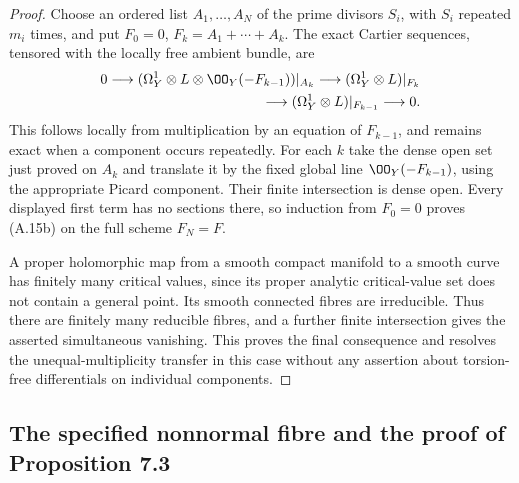 \begin{proof}
Choose an ordered list $A_1,\ldots,A_N$ of the prime divisors $S_i$, with $S_i$ repeated $m_i$ times, and put $F_0=0$, $F_k=A_1+\cdots+A_k$. The exact Cartier sequences, tensored with the locally free ambient bundle, are
\[
\begin{split}
0\longrightarrow
 (\Omega_Y^1\otimes L\otimes\OO_Y(-F_{k-1}))|_{A_k}
 \longrightarrow (\Omega_Y^1\otimes L)|_{F_k}\\
 \longrightarrow(\Omega_Y^1\otimes L)|_{F_{k-1}}
 \longrightarrow0.
\end{split}
\]
This follows locally from multiplication by an equation of $F_{k-1}$, and remains exact when a component occurs repeatedly. For each $k$ take the dense open set just proved on $A_k$ and translate it by the fixed global line $\OO_Y(-F_{k-1})$, using the appropriate Picard component. Their finite intersection is dense open. Every displayed first term has no sections there, so induction from $F_0=0$ proves (A.15b) on the full scheme $F_N=F$.

A proper holomorphic map from a smooth compact manifold to a smooth curve has finitely many critical values, since its proper analytic critical-value set does not contain a general point. Its smooth connected fibres are irreducible. Thus there are finitely many reducible fibres, and a further finite intersection gives the asserted simultaneous vanishing. This proves the final consequence and resolves the unequal-multiplicity transfer in this case without any assertion about torsion-free differentials on individual components.
\end{proof}

\subsection{The specified nonnormal fibre and the proof of Proposition 7.3}

